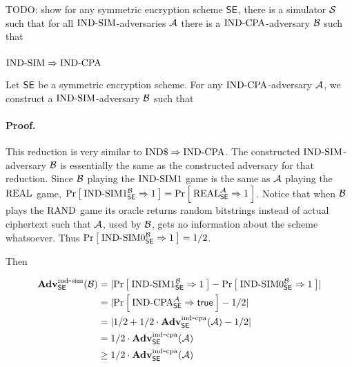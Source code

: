 TODO: show for any symmetric encryption scheme $\textnormal{\textsf{SE}}$, there is
a simulator ${\cal S}$ such that for all $\textnormal{IND-SIM}$-adversaries ${\mathcal A}$ there is
a $\textnormal{IND-CPA}$-adversary ${\mathcal B}$ such that 

\bnm
\AdvINDSIM{\SEscheme}{\advA} \leq \AdvINDCPA{\SEscheme}{\advB}
\enm

\subsubsection*{$\textnormal{IND-SIM} \Rightarrow \textnormal{IND-CPA}$}

Let $\textnormal{\textsf{SE}}$ be a symmetric encryption scheme. For any $\textnormal{IND-CPA}$-adversary
${\mathcal A}$, we construct a $\textnormal{IND-SIM}$-adversary ${\mathcal B}$ such that

\bnm
\AdvINDCPA{\SEscheme}{\advA} \leq \AdvINDSIM{\SEscheme}{\advB}
\enm

\paragraph{Proof.}


This reduction is very similar to $\textnormal{IND\$} \Rightarrow \textnormal{IND-CPA}$.  The
constructed $\textnormal{IND-SIM}$-adversary ${\mathcal B}$ is essentially the same as the
constructed adversary for that reduction. Since ${\mathcal B}$ playing the $\textnormal{IND-SIM}1$
game is the same as ${\mathcal A}$ playing the $\textnormal{REAL}$ game,
$\Pr\left[\: \textnormal{IND-SIM}1_{{\mathsf{SE}}}^{{\mathcal B}} \Rightarrow 1 \:\right] = \Pr\left[\: \textnormal{REAL}_{{\mathsf{SE}}}^{{\mathcal A}} \Rightarrow 1 \:\right]$.
Notice that when ${\mathcal B}$ plays the $\textnormal{RAND}$ game its oracle returns random
bitstrings instead of actual ciphertext such that ${\mathcal A}$, used by ${\mathcal B}$,
gets no information about the scheme whatsoever.  Thus
$\Pr\left[\: \textnormal{IND-SIM}0_{\textnormal{\textsf{SE}}}^{{\mathcal B}} \Rightarrow 1 \:\right] = 1/2$.

Then

\begin{align*}
  \mathbf{Adv}^{\mathrm{ind\mbox{-} sim}}_{\textnormal{\textsf{SE}}}({\mathcal B}) &=
    \lvert\Pr\left[\: \textnormal{IND-SIM}1^{{\mathcal B}}_{\textnormal{\textsf{SE}}} \Rightarrow 1 \:\right] -
          \Pr\left[\: \textnormal{IND-SIM}0^{{\mathcal B}}_{\textnormal{\textsf{SE}}} \Rightarrow 1 \:\right]\rvert \\
  &= \lvert\Pr\left[\: \textnormal{IND-CPA}^{{\mathcal A}}_{\textnormal{\textsf{SE}}} \Rightarrow \mathsf{true} \:\right] - 1 / 2\rvert \\
  &= \lvert1 / 2 + 1 / 2 \cdot \mathbf{Adv}^{\mathrm{ind\mbox{-} cpa}}_{\textnormal{\textsf{SE}}}({\mathcal A}) - 1 / 2\rvert \\
  &= 1 / 2 \cdot \mathbf{Adv}^{\mathrm{ind\mbox{-} cpa}}_{\textnormal{\textsf{SE}}}({\mathcal A}) \\
  &\geq 1 / 2 \cdot \mathbf{Adv}^{\mathrm{ind\mbox{-} cpa}}_{\textnormal{\textsf{SE}}}({\mathcal A})
\end{align*}

